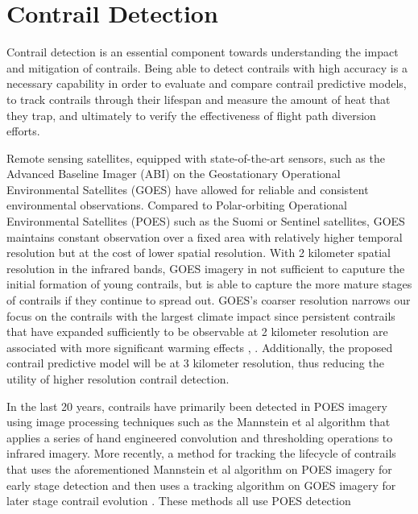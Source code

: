 \section{Contrail Detection}
\label{sec:intro}

Contrail detection is an essential component towards understanding the impact and mitigation of contrails. Being able to detect contrails with high accuracy is a necessary capability in order to evaluate and compare contrail predictive models, to track contrails through their lifespan and measure the amount of heat that they trap, and ultimately to verify the effectiveness of flight path diversion efforts.

Remote sensing satellites, equipped with state-of-the-art sensors, such as the Advanced Baseline Imager (ABI) on the Geostationary Operational Environmental Satellites (GOES) \cite{goes} have allowed for reliable and consistent environmental observations. Compared to Polar-orbiting Operational Environmental Satellites (POES) such as the Suomi or Sentinel satellites, GOES maintains constant observation over a fixed area with relatively higher temporal resolution but at the cost of lower spatial resolution. With 2 kilometer spatial resolution in the infrared bands, GOES imagery in not sufficient to caputure the initial formation of young contrails, but is able to capture the more mature stages of contrails if they continue to spread out. GOES's coarser resolution narrows our focus on the contrails with the largest climate impact since persistent contrails that have expanded sufficiently to be observable at 2 kilometer resolution are associated with more significant warming effects \cite{warm}, \cite{persist}. Additionally, the proposed contrail predictive model will be at 3 kilometer resolution, thus reducing the utility of higher resolution contrail detection. 

In the last 20 years, contrails have primarily been detected in POES imagery using image processing techniques such as the Mannstein et al algorithm \cite{mannstein} that applies a series of hand engineered convolution and thresholding operations to infrared imagery. More recently, a method for tracking the lifecycle of contrails that uses the aforementioned Mannstein et al algorithm on POES imagery for early stage detection and then uses a tracking algorithm on GOES imagery for later stage contrail evolution \cite{track}. These methods all use POES detection 






